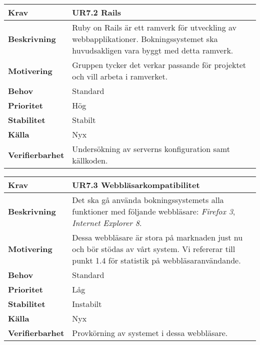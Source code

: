 \documentclass[a4paper, twoside, 11pt, titlepage]{article}
\begin{document}
		\begin {table} [ht] \begin{tabular} { p{2.6cm} p{12.5cm} }
			\hline
			{\sffamily\textbf{Krav}} & {\sffamily\textbf{UR7.2 Rails}} \\
			\hline
			{\sffamily\textbf{Beskrivning}} & {Ruby on Rails är ett ramverk för utveckling av webbapplikationer. Bokningssystemet ska huvudsakligen vara byggt med detta ramverk.} \\
			\hline
			{\sffamily\textbf{Motivering}} & {Gruppen tycker det verkar passande för projektet och vill arbeta i ramverket.} \\
			\hline
			{\sffamily\textbf{Behov}} & {Standard} \\
			\hline
			{\sffamily\textbf{Prioritet}} & {Hög} \\
			\hline
			{\sffamily\textbf{Stabilitet}} & {Stabilt} \\
			\hline
			{\sffamily\textbf{Källa}} & {Nyx} \\
			\hline
			{\sffamily\textbf{Verifierbarhet}} & {Undersökning av serverns konfiguration samt källkoden.} \\
			\hline
		\end{tabular} \end{table} \FloatBarrier
		\vspace{6mm}

		\begin {table} [ht] \begin{tabular} { p{2.6cm} p{12.5cm} }
			\hline
			{\sffamily\textbf{Krav}} & {\sffamily\textbf{UR7.3 Webbläsarkompatibilitet}} \\
			\hline
			{\sffamily\textbf{Beskrivning}} & {Det ska gå använda bokningssystemets alla funktioner med följande webbläsare: \emph{Firefox 3}, \emph{Internet Explorer 8}.} \\
			\hline
			{\sffamily\textbf{Motivering}} & {Dessa webbläsare är stora på marknaden just nu och bör stödas av vårt system. Vi refererar till punkt 1.4 för statistik på webbläsaranvändande.} \\
			\hline
			{\sffamily\textbf{Behov}} & {Standard} \\
			\hline
			{\sffamily\textbf{Prioritet}} & {Låg} \\
			\hline
			{\sffamily\textbf{Stabilitet}} & {Instabilt} \\
			\hline
			{\sffamily\textbf{Källa}} & {Nyx} \\
			\hline
			{\sffamily\textbf{Verifierbarhet}} & {Provkörning av systemet i dessa webbläsare.} \\
			\hline
		\end{tabular} \end{table} \FloatBarrier
		\vspace{6mm}
\end{document}
